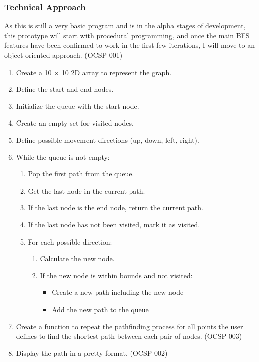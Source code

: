 \subsubsection{Technical Approach}

As this is still a very basic program and is in the alpha stages of development, this prototype will start with procedural programming, and once the main BFS features have been confirmed to work in the first few iterations, I will move to an object-oriented approach. (OCSP-001)
\begin{enumerate}
    \item Create a 10 $\times$ 10 2D array to represent the graph.
    \item Define the start and end nodes.
    \item Initialize the queue with the start node.
    \item Create an empty set for visited nodes.
    \item Define possible movement directions (up, down, left, right).
    \item While the queue is not empty:
        \begin{enumerate}
            \item Pop the first path from the queue.
            \item Get the last node in the current path.
            \item If the last node is the end node, return the current path.
            \item If the last node has not been visited, mark it as visited.
            \item For each possible direction:
                \begin{enumerate}
                    \item Calculate the new node.
                    \item If the new node is within bounds and not visited:
                        \begin{itemize}
                            \item Create a new path including the new node
                            \item Add the new path to the queue
                        \end{itemize}
                \end{enumerate}
        \end{enumerate}
    \item Create a function to repeat the pathfinding process for all points the user defines to find the shortest path between each pair of nodes. (OCSP-003)
    \item Display the path in a pretty format. (OCSP-002)
\end{enumerate}



